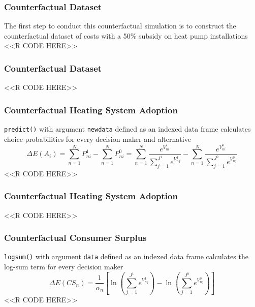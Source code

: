 \documentclass{beamer}
\begin{document}
\begin{frame}[fragile]\frametitle{Counterfactual Dataset}
	The first step to conduct this counterfactual simulation is to construct the counterfactual dataset of costs with a 50\% subsidy on heat pump installations \\
	<<R CODE HERE>>
\end{frame}

\begin{frame}[fragile]\frametitle{Counterfactual Dataset}
	<<R CODE HERE>>
\end{frame}

\begin{frame}[fragile]\frametitle{Counterfactual Heating System Adoption}
	\texttt{predict()} with argument \texttt{newdata} defined as an indexed data frame calculates choice probabilities for every decision maker and alternative
	$$\Delta E(A_i) = \sum_{n = 1}^N P_{ni}^1 - \sum_{n = 1}^N P_{ni}^0 = \sum_{n = 1}^N \frac{e^{V_{ni}^1}}{\sum_{j = 1}^{J^1} e^{V_{nj}^1}} - \sum_{n = 1}^N \frac{e^{V_{ni}^0}}{\sum_{j = 1} ^{J^0} e^{V_{nj}^0}}$$
	<<R CODE HERE>>
\end{frame}

\begin{frame}[fragile]\frametitle{Counterfactual Heating System Adoption}
	<<R CODE HERE>>
\end{frame}

\begin{frame}[fragile]\frametitle{Counterfactual Consumer Surplus}
	\texttt{logsum()} with argument \texttt{data} defined as an indexed data frame calculates the log-sum term for every decision maker
	$$\Delta E(CS_n) = \frac{1}{\alpha_n} \left[ \ln \left( \sum_{j = 1}^{J^1} e^{V_{nj}^1} \right) - \ln \left( \sum_{j = 1}^{J^0} e^{V_{nj}^0} \right) \right]$$
	<<R CODE HERE>>
\end{frame}
\end{document}
